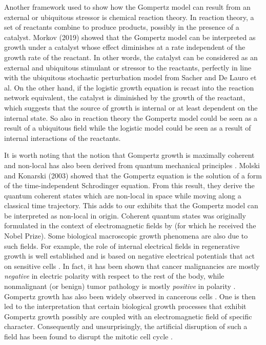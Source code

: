\documentclass{article}
\begin{document}
Another framework used to show how the Gompertz model can result from an external or ubiquitous stressor is chemical reaction theory. In reaction theory, a set of reactants combine to produce products, possibly in the presence of a catalyst. Morkov (2019) \cite{markov2019reaction} showed that the Gompertz model can be interpreted as growth under a catalyst whose effect diminishes at a rate independent of the growth rate of the reactant. In other words, the catalyst can be considered as an external and ubiquitous stimulant or stressor to the reactants, perfectly in line with the ubiquitous stochastic perturbation model from Sacher and De Lauro et al. On the other hand, if the logistic growth equation is recast into the reaction network equivalent, the catalyst is diminished by the growth of the reactant, which suggests that the source of growth is internal or at least dependent on the internal state. So also in reaction theory the Gompertz model could be seen as a result of a ubiquitous field while the logistic model could be seen as a result of internal interactions of the reactants. 

It is worth noting that the notion that Gompertz growth is maximally coherent and non-local has also been derived from quantum mechanical principles \cite{molski2003coherent}. Molski and Konarski (2003) showed that the Gompertz equation is the solution of a form of the time-independent Schrodinger equation. From this result, they derive the quantum coherent states which are non-local in space while moving along a classical time trajectory. This adds to our exhibits that the Gompertz model can be interpreted as non-local in origin. Coherent quantum states was originally formulated in the context of electromagnetic fields by \citet{glauber1963coherent} (for which he received the Nobel Prize). Some biological macroscopic growth phenomena are also due to such fields. For example, the role of internal electrical fields in regenerative growth is well established and is based on negative electrical potentials that act on sensitive cells \cite{becker1984electromagnetic}. In fact, it has been shown that cancer malignancies are mostly \textit{negative} in electric polarity with respect to the rest of the body, while nonmalignant (or benign) tumor pathology is mostly \textit{positive} in polarity \cite{langman1949technique}. Gompertz growth has also been widely observed in cancerous cells \cite{kozusko2003combining,laird1964dynamics}. One is then led to the interpretation that certain biological growth processes that exhibit Gompertz growth possibly are coupled with an electromagnetic field of specific character. Consequently and unsurprisingly, the artificial disruption of such a field has been found to disrupt the mitotic cell cycle \cite{goodman1983pulsing,liboff1981alternating,norton1984bioelectric,liboff1984time}. 
\end{document}
